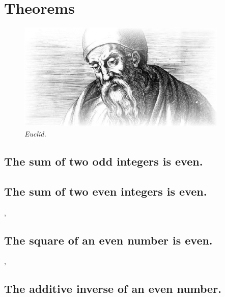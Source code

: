 \documentclass[preview]{standalone}
\begin{document}
\section{Theorems}
\begin{figure}[h!]
    \centering
    \includegraphics[width=10cm]{../resources/jpg/1.6.introduction.to.proofs/euclid.jpg}
    \caption*{\emph{Euclid.}}
\end{figure} 

\subsection{The sum of two odd integers is even.}

\pagebreak


\subsection{The sum of two even integers is even.}

\sep


\subsection{The square of an even number is even.}

\sep


\subsection{The additive inverse of an even number.}
 
\pagebreak
\end{document}
